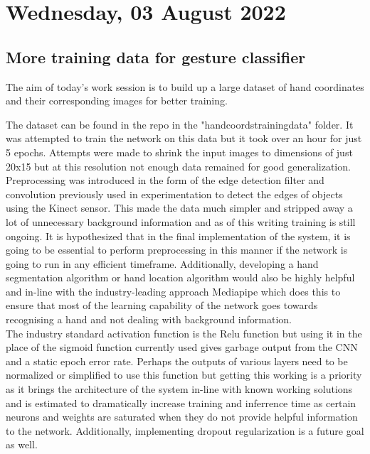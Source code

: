 \section[2022/08/03]{Wednesday, 03 August 2022}

\subsection{More training data for gesture classifier}

The aim of today's work session is to build up a large dataset of hand coordinates and their corresponding images for better training.

The dataset can be found in the repo in the "handcoordstrainingdata" folder. It was attempted to train the network on this data but it took over an hour for just 5 epochs. Attempts were made to shrink the input images to dimensions of just 20x15 but at this resolution not enough data remained for good generalization. Preprocessing was introduced in the form of the edge detection filter and convolution previously used in experimentation to detect the edges of objects using the Kinect sensor. This made the data much simpler and stripped away a lot of unnecessary background information and as of this writing training is still ongoing. It is hypothesized that in the final implementation of the system, it is going to be essential to perform preprocessing in this manner if the network is going to run in any efficient timeframe. Additionally, developing a hand segmentation algorithm or hand location algorithm would also be highly helpful and in-line with the industry-leading approach Mediapipe which does this to ensure that most of the learning capability of the network goes towards recognising a hand and not dealing with background information. \\

The industry standard activation function is the Relu function but using it in the place of the sigmoid function currently used gives garbage output from the CNN and a static epoch error rate. Perhaps the outputs of various layers need to be normalized or simplified to use this function but getting this working is a priority as it brings the architecture of the system in-line with known working solutions and is estimated to dramatically increase training and inferrence time as certain neurons and weights are saturated when they do not provide helpful information to the network. Additionally, implementing dropout regularization is a future goal as well.


